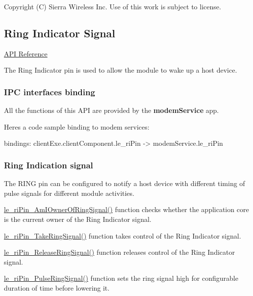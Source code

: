 Copyright (C) Sierra Wireless Inc. Use of this work is subject to license. \hypertarget{c_riPin}{}\subsection{Ring Indicator Signal}\label{c_riPin}
\hyperlink{le__ri_pin__interface_8h}{A\+P\+I Reference}





The Ring Indicator pin is used to allow the module to wake up a host device.\hypertarget{c_ri_pin_c_riPin_binding}{}\subsubsection{I\+P\+C interfaces binding}\label{c_ri_pin_c_riPin_binding}
All the functions of this A\+P\+I are provided by the {\bfseries modem\+Service} app.

Here\textquotesingle{}s a code sample binding to modem services\+: \begin{DoxyVerb}bindings:
{
   clientExe.clientComponent.le_riPin -> modemService.le_riPin
}
\end{DoxyVerb}
\hypertarget{c_ri_pin_c_riPin_usage}{}\subsubsection{Ring Indication signal}\label{c_ri_pin_c_riPin_usage}
The R\+I\+N\+G pin can be configured to notify a host device with different timing of pulse signals for different module activities.


\begin{DoxyItemize}
\item \hyperlink{le__ri_pin__interface_8h_a3fa556aaae988f3a835ac2bc89cbfd59}{le\+\_\+ri\+Pin\+\_\+\+Am\+I\+Owner\+Of\+Ring\+Signal()} function checks whether the application core is the current owner of the Ring Indicator signal.
\item \hyperlink{le__ri_pin__interface_8h_a2cdbeb7aa773f498780058bea06c6553}{le\+\_\+ri\+Pin\+\_\+\+Take\+Ring\+Signal()} function takes control of the Ring Indicator signal.
\item \hyperlink{le__ri_pin__interface_8h_a7fd705c4c6ae5e70c076461b25379440}{le\+\_\+ri\+Pin\+\_\+\+Release\+Ring\+Signal()} function releases control of the Ring Indicator signal.
\item \hyperlink{le__ri_pin__interface_8h_afdf9b77f43ec0cd8c7ceb91e5993d382}{le\+\_\+ri\+Pin\+\_\+\+Pulse\+Ring\+Signal()} function sets the ring signal high for configurable duration of time before lowering it.
\end{DoxyItemize}





